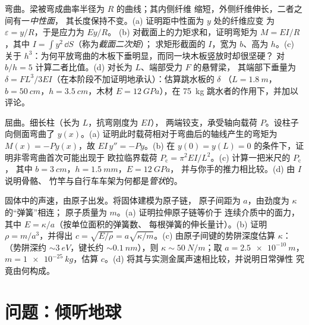 \begin{exercise}[$\star\star\star$]\label{exo:b3:continuum-elasticity:10}
弯曲。梁被弯成曲率半径为 $R$ 的曲线；其内侧纤维
缩短，外侧纤维伸长，二者之间有一\emph{中性面}，
其长度保持不变。(a) 证明距中性面为 $y$ 处的纤维应变
为 $\varepsilon = y/R$，于是应力为 $Ey/R$。
(b) 对截面上的力矩求和，证明弯矩为
$M = EI/R$，其中 $I = \int y^2\,\dd S$（称为\emph{截面二次矩}）；
求矩形截面的 $I$，宽为 $b$、高为 $h$。(c) 关于
$h^3$：为何平放弯曲的木板下垂明显，而同一块木板竖放时却很坚硬？
对 $b/h = 5$ 计算二者比值。(d) 对长为 $L$、端部受力 $F$ 的悬臂梁，
其端部下垂量为
$\delta = FL^3/3EI$（在本阶段不加证明地承认）：估算跳水板的 $\delta$
（$L = \qty{1.8}{m}$，$b = \qty{50}{cm}$，$h = \qty{3.5}{cm}$，木材 $E
= \qty{12}{GPa}$），在 \qty{75}{kg} 跳水者的作用下，并加以评论。
\end{exercise}

\begin{exercise}[$\star\star\star$]\label{exo:b3:continuum-elasticity:11}
屈曲。细长柱（长为 $L$，抗弯刚度为 $EI$），
两端铰支，承受轴向载荷 $P$。设柱子向侧面弯曲了
$y(x)$。(a) 证明此时载荷相对于弯曲后的轴线产生的弯矩为
$M(x) = -Py(x)$，故 $EI\,y'' = -Py$。(b)
在 $y(0) = y(L) = 0$ 的条件下，证明非零弯曲首次可能出现于
欧拉临界载荷
$P_{\text{c}} = \pi^2EI/L^2$。(c) 计算一把米尺的 $P_{\text{c}}$，
其中 $b = \qty{3}{cm}$，$h = \qty{1.5}{mm}$，$E = \qty{12}{GPa}$，
并与你手的推力相比较。(d) 由 $I$ 说明骨骼、
竹竿与自行车车架为何都是\emph{管状}的。
\end{exercise}

\begin{exercise}[$\star\star\star$]\label{exo:b3:continuum-elasticity:12}
固体中的声速，由原子出发。将固体建模为原子链，
原子间距为 $a$，由劲度为 $\kappa$ 的“弹簧”相连；
原子质量为 $m$。(a) 证明拉伸原子链等价于
连续介质中的面力，其中 $E = \kappa/a$（按单位面积的弹簧数、
每根弹簧的伸长量计）。(b) 证明 $\rho = m/a^3$，并得出 $c =
\sqrt{E/\rho} = a\sqrt{\kappa/m}$。(c) 由原子间键的势阱深度估算 $\kappa$：
（势阱深约 $\sim\qty{3}{eV}$，键长约 $\sim
\qty{0.1}{nm}$），则 $\kappa \sim \qty{50}{N/m}$；取 $a =
\qty{2.5e-10}{m}$，$m = \qty{1e-25}{kg}$，估算 $c$。(d)
将其与实测金属声速相比较，并说明日常弹性
究竟由何构成。
\end{exercise}

\section{问题：倾听地球}

